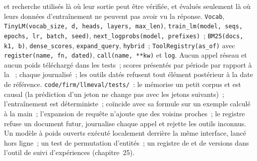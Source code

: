\begin{build}
  et recherche utilisés là où leur sortie peut être vérifiée, et évalués seulement là où leurs
données d'entraînement ne peuvent pas avoir vu la réponse.
 \texttt{Vocab}, \texttt{TinyLM(vocab\_size, d, heads, layers, max\_len)},
\texttt{train\_lm(model, seqs, epochs, lr, batch, seed)}, \texttt{next\_logprobs(model, prefixes)}~; \texttt{BM25(docs, k1, b)}, \texttt{dense\_scores},
\texttt{expand\_query}, \texttt{hybrid}~; \texttt{ToolRegistry(as\_of)} avec \texttt{register(name, fn, dated)},
\texttt{call(name, **kw)} et \texttt{log}.
 Aucun appel réseau et aucun poids téléchargé dans les tests~; scores présentés par période par rapport à la ~; chaque  journalisé~; les outils datés refusent tout élément postérieur à la date de référence.
 \texttt{code/firm/llmeval/tests/}~: le  mémorise un petit corpus et est causal (la
prédiction d'un jeton ne change pas avec les jetons suivants)~; l'entraînement est déterministe~;  coïncide avec sa formule sur un exemple calculé à la main~;
l'expansion de requête n'ajoute que des voisins proches~; le registre refuse un document futur, journalise chaque appel et rejette les outils
inconnus.
 Un modèle à poids ouverts exécuté localement derrière la même interface, lancé hors ligne~; un test de permutation d'entités~; un registre de  et de versions
dans l'outil de suivi d'expériences (chapitre~25).
\end{build}

